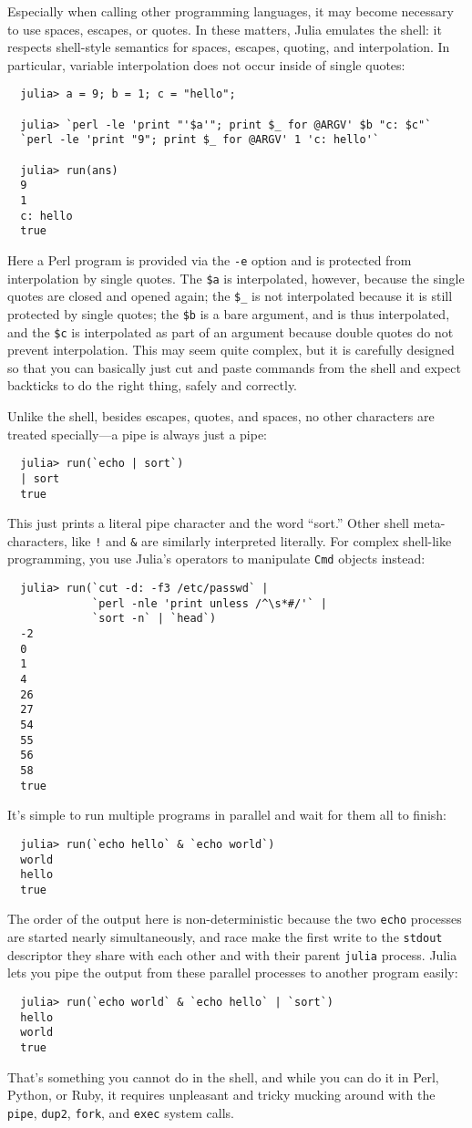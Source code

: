 \documentclass{article}
\begin{document}
Especially when calling other programming languages, it may become necessary to use spaces, escapes, or quotes.
In these matters, Julia emulates the shell:
it respects shell-style semantics for spaces, escapes, quoting, and interpolation.
In particular, variable interpolation does not occur inside of single quotes:
\begin{verbatim}
  julia> a = 9; b = 1; c = "hello";

  julia> `perl -le 'print "'$a'"; print $_ for @ARGV' $b "c: $c"`
  `perl -le 'print "9"; print $_ for @ARGV' 1 'c: hello'`

  julia> run(ans)
  9
  1
  c: hello
  true
\end{verbatim}
Here a Perl program is provided via the \verb|-e| option and is protected from interpolation by single quotes.
The \verb|$a| is interpolated, however, because the single quotes are closed and opened again;
the \verb|$_| is not interpolated because it is still protected by single quotes;
the \verb|$b| is a bare argument, and is thus interpolated, and the \verb|$c| is interpolated as part of an argument because double quotes do not prevent interpolation.
This may seem quite complex, but it is carefully designed so that you can basically just cut and paste commands from the shell and expect backticks to do the right thing, safely and correctly.

Unlike the shell, besides escapes, quotes, and spaces, no other characters are treated specially---a pipe is always just a pipe:
\begin{verbatim}
  julia> run(`echo | sort`)
  | sort
  true
\end{verbatim}
This just prints a literal pipe character and the word ``sort.''
Other shell meta-characters, like \verb|!| and \verb|&| are similarly interpreted literally.
For complex shell-like programming, you use Julia's operators to manipulate \verb|Cmd| objects instead:
\begin{verbatim}
  julia> run(`cut -d: -f3 /etc/passwd` |
             `perl -nle 'print unless /^\s*#/'` |
             `sort -n` | `head`)
  -2
  0
  1
  4
  26
  27
  54
  55
  56
  58
  true
\end{verbatim}
It's simple to run multiple programs in parallel and wait for them all to finish:
\begin{verbatim}
  julia> run(`echo hello` & `echo world`)
  world
  hello
  true
\end{verbatim}
The order of the output here is non-deterministic because the two \verb|echo| processes are started nearly simultaneously, and race make the first write to the \verb|stdout| descriptor they share with each other and with their parent \verb|julia| process.
Julia lets you pipe the output from these parallel processes to another program easily:
\begin{verbatim}
  julia> run(`echo world` & `echo hello` | `sort`)
  hello
  world
  true
\end{verbatim}
That's something you cannot do in the shell, and while you can do it in Perl, Python, or Ruby, it requires unpleasant and tricky mucking around with the \verb|pipe|, \verb|dup2|, \verb|fork|, and \verb|exec| system calls.
\end{document}
